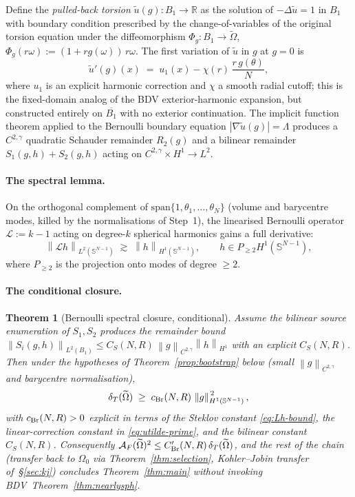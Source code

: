 \documentclass[11pt]{amsart}
\newtheorem{theorem}{Theorem}[section]
\theoremstyle{definition}
\newcommand{\R}{\mathbb R}
\newcommand{\Otil}{\widetilde\Omega}
\newcommand{\dT}{\delta_T}
\newcommand{\AF}{\mathcal A_F}
\newcommand{\Sph}{\mathbb S^{N-1}}
\newcommand{\norm}[1]{\left\|#1\right\|}
\begin{document}
Define the \emph{pulled-back torsion} $\widetilde u(g):B_1\to\R$ as
the solution of $-\Delta\widetilde u=1$ in $B_1$ with boundary
condition prescribed by the change-of-variables of the original
torsion equation under the diffeomorphism
$\Phi_g:B_1\to\Otil$, $\Phi_g(r\omega):=(1+r g(\omega))\,r\omega$.
The first variation of $\widetilde u$ in $g$ at $g=0$ is
\begin{equation}\label{eq:utilde-prime}
   \widetilde u'(g)(x)\;=\;u_1(x)-\chi(r)\,\frac{r\,g(\theta)}{N},
\end{equation}
where $u_1$ is an explicit harmonic correction and $\chi$ a smooth
radial cutoff; this is the fixed-domain analog of the BDV
exterior-harmonic expansion, but constructed entirely on $\overline{B_1}$
with no exterior continuation.  The implicit function theorem
applied to the Bernoulli boundary equation $|\nabla\widetilde u(g)|
=\Lambda$ produces a $C^{2,\gamma}$ quadratic Schauder remainder
$R_2(g)$ and a bilinear remainder $S_1(g,h)+S_2(g,h)$ acting on
$C^{2,\gamma}\times H^1\to L^2$.

\paragraph{The spectral lemma.}
On the orthogonal complement of $\mathrm{span}\{1,\theta_1,\dots,
\theta_N\}$ (volume and barycentre modes, killed by the
normalisations of Step~1), the linearised Bernoulli operator
$\mathcal L:=k-1$ acting on degree-$k$ spherical harmonics gains a
full derivative:
\begin{equation}\label{eq:Lh-bound}
   \norm{\mathcal L h}_{L^2(\Sph)}
   \;\gtrsim\;\norm{h}_{H^1(\Sph)},
   \qquad h\in P_{\ge 2}H^1(\Sph),
\end{equation}
where $P_{\ge 2}$ is the projection onto modes of degree $\ge 2$.

\paragraph{The conditional closure.}

\begin{theorem}[Bernoulli spectral closure, conditional]
\label{thm:bernoulli-spectral}
Assume the bilinear source enumeration of $S_1,S_2$ produces the
remainder bound $\norm{S_i(g,h)}_{L^2(B_1)}\le C_S(N,R)\,\norm{g}_{
C^{2,\gamma}}\norm{h}_{H^1}$ with an explicit $C_S(N,R)$.  Then
under the hypotheses of Theorem~\ref{prop:bootstrap} below
\textup{(}small $\norm{g}_{C^{2,\gamma}}$ and barycentre normalisation\textup{)},
\[
   \dT(\Otil)\;\ge\;c_{\rm Br}(N,R)\,\norm{g}_{H^1(\Sph)}^{\,2},
\]
with $c_{\rm Br}(N,R)>0$ explicit in terms of the Steklov constant
\eqref{eq:Lh-bound}, the linear-correction constant in
\eqref{eq:utilde-prime}, and the bilinear constant $C_S(N,R)$.
Consequently
$\AF(\Otil)^{2}\le C_{\rm Br}'(N,R)\,\dT(\Otil)$, and the rest of the
chain (transfer back to $\Omega_0$ via Theorem~\ref{thm:selection},
Kohler--Jobin transfer of~\S\ref{sec:kj}) concludes
Theorem~\ref{thm:main} without invoking
BDV~Theorem~\ref{thm:nearlysph}.
\end{theorem}
\end{document}

